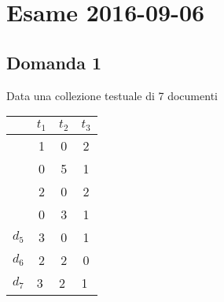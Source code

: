 
\section{Esame 2016-09-06}

\subsection{Domanda 1}

Data una collezione testuale di 7 documenti

\begin{table}[htbp]
	\centering
	
	\begin{tabular}{c|c|c|c|}
		\cline{2-4}
		& \textbf{$t_1$}                                 & \textbf{$t_2$}                                 & \textbf{$t_3$}                                 \\ \hline
		\rowcolor[HTML]{EFEFEF} 
		\multicolumn{1}{|c|}{\cellcolor[HTML]{EFEFEF}{\color[HTML]{32CB00} $d_1$}} & {\color[HTML]{32CB00} 1}                      & {\color[HTML]{32CB00} 0}                      & {\color[HTML]{32CB00} 2}                      \\ \hline
		\rowcolor[HTML]{EFEFEF} 
		\multicolumn{1}{|c|}{\cellcolor[HTML]{EFEFEF}$d_2$}                        & 0                                             & 5                                             & 1                                             \\ \hline
		\rowcolor[HTML]{EFEFEF} 
		\multicolumn{1}{|c|}{\cellcolor[HTML]{EFEFEF}{\color[HTML]{32CB00} $d_3$}} & {\color[HTML]{32CB00} 2}                      & {\color[HTML]{32CB00} 0}                      & {\color[HTML]{32CB00} 2}                      \\ \hline
		\rowcolor[HTML]{EFEFEF} 
		\multicolumn{1}{|c|}{\cellcolor[HTML]{EFEFEF}$d_4$}                        & 0                                             & 3                                             & 1                                             \\ \hline
		\multicolumn{1}{|c|}{$d_5$}                                                & 3                                             & 0                                             & 1                                             \\ \hline
		\multicolumn{1}{|c|}{$d_6$}                                                & 2                                             & 2                                             & 0                                             \\ \hline
		\multicolumn{1}{|l|}{{\color[HTML]{32CB00} $d_7$}}                         & \multicolumn{1}{l|}{{\color[HTML]{32CB00} 3}} & \multicolumn{1}{l|}{{\color[HTML]{32CB00} 2}} & \multicolumn{1}{l|}{{\color[HTML]{32CB00} 1}} \\ \hline
	\end{tabular}
\end{table}

